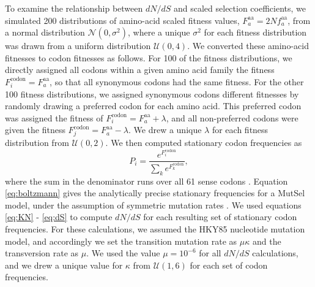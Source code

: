\documentclass[11pt]{article}
\begin{document}
To examine the relationship between $dN/dS$ and scaled selection coefficients, we simulated 200 distributions of amino-acid scaled fitness values, $F^\text{aa}_a = 2Nf^\text{aa}_a$, from a normal distribution $\mathcal{N}(0,\sigma^2)$, where a unique $\sigma^2$ for each fitness distribution was drawn from a uniform distribution $\mathcal{U}(0,4)$. We converted these amino-acid fitnesses to codon fitnesses as follows. For 100 of the fitness distributions, we directly assigned all codons within a given amino acid family the fitness $F^\text{codon}_i = F^\text{aa}_a$, so that all synonymous codons had the same fitness. For the other 100 fitness distributions, we assigned synonymous codons different fitnesses by randomly drawing a preferred codon for each amino acid. This preferred codon was assigned the fitness of $F^\text{codon}_i = F^\text{aa}_a + \lambda$, and all non-preferred codons were given the fitness $F^\text{codon}_j = F^\text{aa}_a - \lambda$. We drew a unique $\lambda$ for each fitness distribution from $\mathcal{U}(0,2)$. 
We then computed stationary codon frequencies as 
\begin{equation}\label{eq:boltzmann}
P_i = \frac{e^{F^\text{codon}_i}}{\sum_k e^{F^\text{codon}_k}}, 
\end{equation} where the sum in the denominator runs over all 61 sense codons \citep{SellaHirsh2005}. Equation \eqref{eq:boltzmann} gives the analytically precise stationary frequencies for a MutSel model, under the assumption of symmetric mutation rates \citep{SellaHirsh2005}. We used equations \eqref{eq:KN} - \eqref{eq:dS} to compute $dN/dS$ for each resulting set of stationary codon frequencies. For these calculations, we assumed the HKY85 \citep{HKY85} nucleotide mutation model, and accordingly we set the transition mutation rate as $\mu\kappa$ and the transversion rate as $\mu$. We used the value $\mu = 10^{-6}$ for all $dN/dS$ calculations, and we drew a unique value for $\kappa$ from $\mathcal{U}(1,6)$ for each set of codon frequencies.
\end{document}

